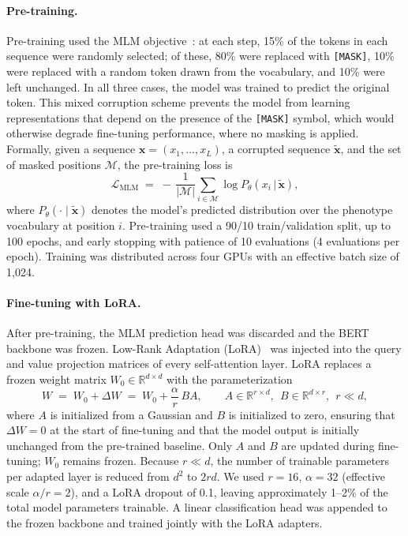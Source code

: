 \documentclass[12pt]{article}
\begin{document}
\paragraph{Pre-training.}
Pre-training used the MLM objective~\citep{Devlin2019BERT}: at each step, 15\% of the tokens in each sequence were randomly selected; of these, 80\% were replaced with \texttt{[MASK]}, 10\% were replaced with a random token drawn from the vocabulary, and 10\% were left unchanged. In all three cases, the model was trained to predict the original token. This mixed corruption scheme prevents the model from learning representations that depend on the presence of the \texttt{[MASK]} symbol, which would otherwise degrade fine-tuning performance, where no masking is applied. Formally, given a sequence $\mathbf{x} = (x_1, \dots, x_L)$, a corrupted sequence $\tilde{\mathbf{x}}$, and the set of masked positions $\mathcal{M}$, the pre-training loss is
\begin{equation}
\mathcal{L}_{\mathrm{MLM}} \;=\; -\,\frac{1}{|\mathcal{M}|}\sum_{i \in \mathcal{M}} \log P_\theta\!\left(x_i \,\big|\, \tilde{\mathbf{x}}\right),
\label{eq:mlm}
\end{equation}
where $P_\theta(\cdot \mid \tilde{\mathbf{x}})$ denotes the model's predicted distribution over the phenotype vocabulary at position $i$. Pre-training used a 90/10 train/validation split, up to 100 epochs, and early stopping with patience of 10 evaluations (4 evaluations per epoch). Training was distributed across four GPUs with an effective batch size of 1{,}024.

\paragraph{Fine-tuning with LoRA.}
After pre-training, the MLM prediction head was discarded and the BERT backbone was frozen. Low-Rank Adaptation (LoRA)~\citep{Hu2022LoRA} was injected into the query and value projection matrices of every self-attention layer. LoRA replaces a frozen weight matrix $W_0 \in \mathbb{R}^{d \times d}$ with the parameterization
\begin{equation}
W \;=\; W_0 + \Delta W \;=\; W_0 + \frac{\alpha}{r}\,B A,
\qquad
A \in \mathbb{R}^{r \times d},\ \ B \in \mathbb{R}^{d \times r},\ \ r \ll d,
\label{eq:lora}
\end{equation}
where $A$ is initialized from a Gaussian and $B$ is initialized to zero, ensuring that $\Delta W = 0$ at the start of fine-tuning and that the model output is initially unchanged from the pre-trained baseline. Only $A$ and $B$ are updated during fine-tuning; $W_0$ remains frozen. Because $r \ll d$, the number of trainable parameters per adapted layer is reduced from $d^2$ to $2rd$. We used $r = 16$, $\alpha = 32$ (effective scale $\alpha/r = 2$), and a LoRA dropout of 0.1, leaving approximately 1--2\% of the total model parameters trainable. A linear classification head was appended to the frozen backbone and trained jointly with the LoRA adapters.
\end{document}
